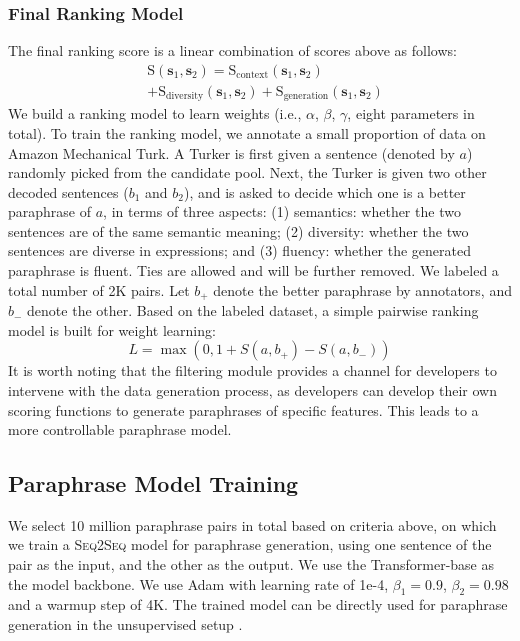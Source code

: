 \documentclass[11pt,a4paper]{article}
\newcommand{\sts}{{{\textsc{Seq2Seq}}}\xspace}
\begin{document}
\subsubsection{Final Ranking Model}
\label{ranking}
The final ranking score
 is a linear combination of scores above as follows:
\begin{equation}
\begin{aligned}
&\text{S}(\bm{s}_1, \bm{s}_2) =  \text{S}_{\text{context}}(\bm{s}_1, \bm{s}_2)  \\
&+ \text{S}_{\text{diversity}}(\bm{s}_1, \bm{s}_2)  + \text{S}_{\text{generation}}(\bm{s}_1, \bm{s}_2) 
\end{aligned}
\end{equation}
We build a ranking model to  learn
weights (i.e., $\alpha$, $\beta$, $\gamma$, eight parameters in total). To train the ranking  model, 
we annotate a small proportion of data  on Amazon Mechanical Turk. 
A Turker is first given a sentence (denoted by $a$) randomly picked from 
the
 candidate pool. Next, the Turker is given two other decoded sentences ($b_1$ and $b_2$), and is asked to decide which one is a better paraphrase of $a$,
in terms of three aspects: 
(1) semantics: whether the two sentences are of the same semantic meaning;
(2) diversity: whether the two sentences are diverse in expressions; and 
(3) fluency: whether the generated paraphrase is fluent. 
Ties are allowed and will be further removed. We  labeled a total number of  2K pairs.  
Let $b_{+}$ denote the better paraphrase by annotators, and $b_{-}$ denote the other. 
 Based on the labeled dataset,  a simple pairwise ranking model \cite{liu2011learning}  is built for weight learning:
\begin{equation}
L = \max(0, 1+S(a, b_{+})-S(a, b_{-}))
\end{equation}
It is worth noting that the filtering module 
 provides a channel for developers to intervene with the data generation process, as  developers can develop their own scoring functions to generate paraphrases of specific features. This leads to a more controllable paraphrase model. 
 
\subsection{Paraphrase Model Training}
\label{sec:training}
We select 10 million paraphrase pairs in total based on criteria above, on which 
we train a \sts model for paraphrase generation, using one sentence of the pair as the input, and the other as the output. 
We use the  Transformer-base \citep{vaswani2017attention} as the model backbone.
We use Adam \citep{kingma2014adam} with learning rate of 1e-4, $\beta_1=0.9$,
$\beta_2=0.98$ and a warmup step of 4K.
The trained model can be directly used for paraphrase generation in the unsupervised setup \citep{roy2019unsupervised,liu2019unsupervised}.
\end{document}

